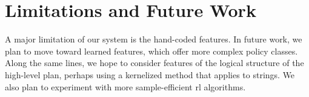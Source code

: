 \section{Limitations and Future Work}
A major limitation of our system is the hand-coded features. In future
work, we plan to move toward learned features, which offer more
complex policy classes. Along the same lines, we hope to consider
features of the logical structure of the high-level plan, perhaps
using a kernelized method that applies to strings. We also plan to
experiment with more sample-efficient {\sc rl} algorithms.


